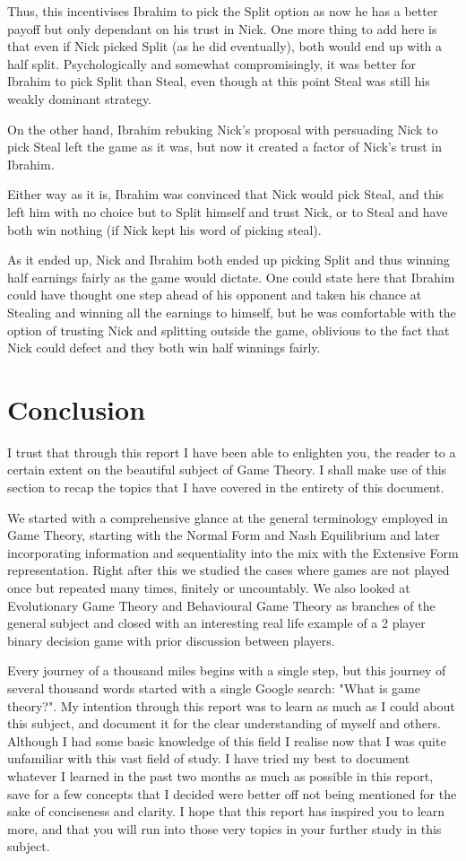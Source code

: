 \documentclass[11pt]{article}
\theoremstyle{definition}
\begin{document}
Thus, this incentivises Ibrahim to pick the Split option as now he has a better payoff but only dependant on his trust in Nick. One more thing to add here is that even if Nick picked Split (as he did eventually), both would end up with a half split. Psychologically and somewhat compromisingly, it was better for Ibrahim to pick Split than Steal, even though at this point Steal was still his weakly dominant strategy.

On the other hand, Ibrahim rebuking Nick’s proposal with persuading Nick to pick Steal left the game as it was, but now it created a factor of Nick’s trust in Ibrahim.
	
Either way as it is, Ibrahim was convinced that Nick would pick Steal, and this left him with no choice but to Split himself and trust Nick, or to Steal and have both win nothing (if Nick kept his word of picking steal).
	
As it ended up, Nick and Ibrahim both ended up picking Split and thus winning half earnings fairly as the game would dictate. One could state here that Ibrahim could have thought one step ahead of his opponent and taken his chance at Stealing and winning all the earnings to himself, but he was comfortable with the option of trusting Nick and splitting outside the game, oblivious to the fact that Nick could defect and they both win half winnings fairly.

\section{Conclusion}
I trust that through this report I have been able to enlighten you, the reader to a certain extent on the beautiful subject of Game Theory. I shall make use of this section to recap the topics that I have covered in the entirety of this document.

We started with a comprehensive glance at the general terminology employed in Game Theory, starting with the Normal Form and Nash Equilibrium and later incorporating information and sequentiality into the mix with the Extensive Form representation. Right after this we studied the cases where games are not played once but repeated many times, finitely or uncountably. We also looked at Evolutionary Game Theory and Behavioural Game Theory as branches of the general subject and closed with an interesting real life example of a 2 player binary decision game with prior discussion between players.

Every journey of a thousand miles begins with a single step, but this journey of several thousand words started with a single Google search: "What is game theory?". My intention through this report was to learn as much as I could about this subject, and document it for the clear understanding of myself and others. Although I had some basic knowledge of this field I realise now that I was quite unfamiliar with this vast field of study. I have tried my best to document whatever I learned in the past two months as much as possible in this report, save for a few concepts that I decided were better off not being mentioned for the sake of conciseness and clarity. I hope that this report has inspired you to learn more, and that you will run into those very topics in your further study in this subject. 
\end{document}
